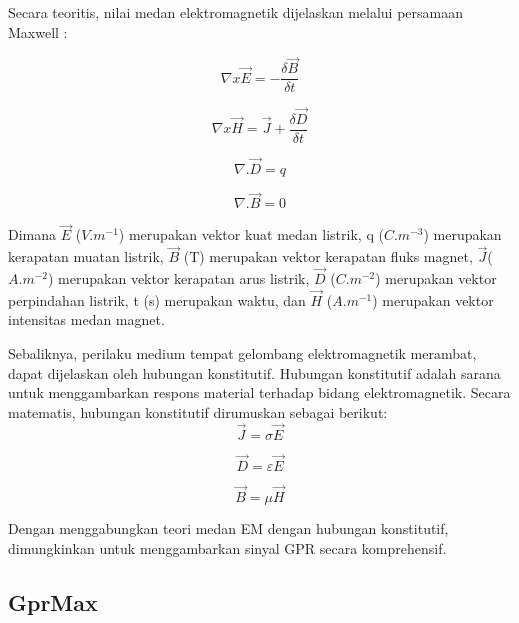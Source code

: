 Secara teoritis, nilai medan elektromagnetik dijelaskan melalui persamaan Maxwell : 

\begin{equation}
  \label{eq:maxWellE}
  \nabla  x \vec{E} = - \frac{ \delta  \vec{B}}{ \delta t} 
\end{equation}

\begin{equation}
  \label{eq:maxWellH}
  \nabla x  \vec{H}  =   \vec{J}  + \frac{ \delta  \vec{D} }{ \delta t} 
\end{equation}

\begin{equation}
  \label{eq:maxWellD}
  \nabla . \vec{D} =  q
\end{equation}

\begin{equation}
  \label{eq:maxWellB}
  \nabla . \vec{B} =  0
\end{equation}

Dimana $\vec{E}$ ($V.m^{-1}$) merupakan vektor kuat medan listrik, q ($C.m^{-3}$) merupakan kerapatan muatan listrik, $\vec{B}$ (T) merupakan vektor kerapatan fluks magnet, $\vec{J}$($A.m^{-2}$) merupakan vektor kerapatan arus listrik, $\vec{D}$ ($C.m^{-2}$) merupakan vektor perpindahan listrik, t (s) merupakan waktu, dan $\vec{H}$ ($A.m^{-1}$) merupakan vektor intensitas medan magnet. \parencite{jol2008ground}

Sebaliknya, perilaku medium tempat gelombang elektromagnetik merambat, dapat dijelaskan oleh hubungan konstitutif. 
Hubungan konstitutif adalah sarana untuk menggambarkan respons material terhadap bidang elektromagnetik. 
Secara matematis, hubungan konstitutif dirumuskan sebagai berikut:
\begin{equation}
  \label{eq:mediumJ}
  \vec{J} =  \sigma \vec{E}
\end{equation}

\begin{equation}
  \label{eq:mediumD}
  \vec{D} =  \varepsilon \vec{E}
\end{equation}

\begin{equation}
  \label{eq:mediumB}
  \vec{B} =  \mu \vec{H}
\end{equation}

Dengan menggabungkan teori medan EM dengan hubungan konstitutif, dimungkinkan untuk menggambarkan sinyal GPR secara komprehensif.


\subsection{GprMax}
\label{subsec:gprMax}

